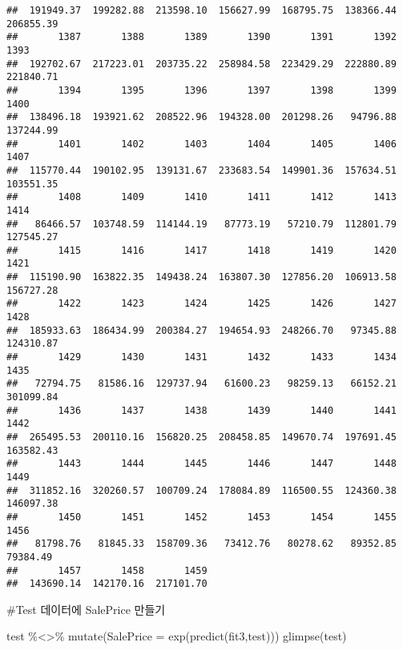 \documentclass[
]{article}
\newenvironment{Shaded}{\begin{snugshade}}{\end{snugshade}}
\newcommand{\AttributeTok}[1]{\textcolor[rgb]{0.77,0.63,0.00}{#1}}
\newcommand{\FunctionTok}[1]{\textcolor[rgb]{0.00,0.00,0.00}{#1}}
\newcommand{\NormalTok}[1]{#1}
\newcommand{\SpecialCharTok}[1]{\textcolor[rgb]{0.00,0.00,0.00}{#1}}
\begin{document}
\begin{verbatim}
##  191949.37  199282.88  213598.10  156627.99  168795.75  138366.44  206855.39 
##       1387       1388       1389       1390       1391       1392       1393 
##  192702.67  217223.01  203735.22  258984.58  223429.29  222880.89  221840.71 
##       1394       1395       1396       1397       1398       1399       1400 
##  138496.18  193921.62  208522.96  194328.00  201298.26   94796.88  137244.99 
##       1401       1402       1403       1404       1405       1406       1407 
##  115770.44  190102.95  139131.67  233683.54  149901.36  157634.51  103551.35 
##       1408       1409       1410       1411       1412       1413       1414 
##   86466.57  103748.59  114144.19   87773.19   57210.79  112801.79  127545.27 
##       1415       1416       1417       1418       1419       1420       1421 
##  115190.90  163822.35  149438.24  163807.30  127856.20  106913.58  156727.28 
##       1422       1423       1424       1425       1426       1427       1428 
##  185933.63  186434.99  200384.27  194654.93  248266.70   97345.88  124310.87 
##       1429       1430       1431       1432       1433       1434       1435 
##   72794.75   81586.16  129737.94   61600.23   98259.13   66152.21  301099.84 
##       1436       1437       1438       1439       1440       1441       1442 
##  265495.53  200110.16  156820.25  208458.85  149670.74  197691.45  163582.43 
##       1443       1444       1445       1446       1447       1448       1449 
##  311852.16  320260.57  100709.24  178084.89  116500.55  124360.38  146097.38 
##       1450       1451       1452       1453       1454       1455       1456 
##   81798.76   81845.33  158709.36   73412.76   80278.62   89352.85   79384.49 
##       1457       1458       1459 
##  143690.14  142170.16  217101.70
\end{verbatim}

\#Test 데이터에 SalePrice 만들기

\begin{Shaded}
\begin{Highlighting}[]
\NormalTok{test }\SpecialCharTok{\%\textless{}\textgreater{}\%} \FunctionTok{mutate}\NormalTok{(}\AttributeTok{SalePrice =} \FunctionTok{exp}\NormalTok{(}\FunctionTok{predict}\NormalTok{(fit3,test)))}
\FunctionTok{glimpse}\NormalTok{(test)}
\end{Highlighting}
\end{Shaded}
\end{document}
